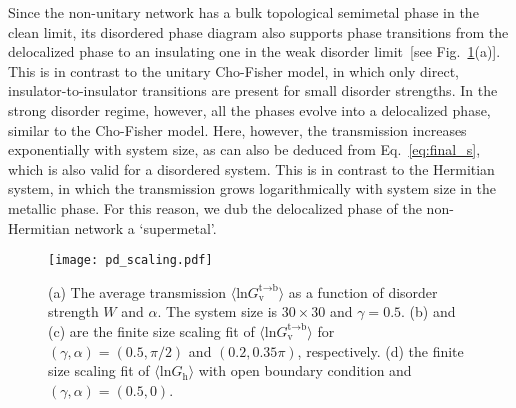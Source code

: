\documentclass[aps,pra,reprint,superscriptaddress,showkeys,amsmath,amssymb,longbibliography]{revtex4-1}
\begin{document}
Since the non-unitary network has a bulk topological semimetal phase in the clean limit, its disordered phase diagram also supports phase transitions from the delocalized phase to an insulating one in the weak disorder limit~[see Fig.\ \ref{fig: pd_disorder}(a)].
This is in contrast to the unitary Cho-Fisher model, in which only direct, insulator-to-insulator transitions are present for small disorder strengths.
In the strong disorder regime, however, all the phases evolve into a delocalized phase, similar to the Cho-Fisher model.
Here, however, the transmission increases exponentially with system size, as can also be deduced from Eq.~\eqref{eq:final_s}, which is also valid for a disordered system.
This is in contrast to the Hermitian system, in which the transmission grows logarithmically with system size in the metallic phase.
For this reason, we dub the delocalized phase of the non-Hermitian network a `supermetal'.

\begin{figure}
\centering
\texttt{[image: pd\_scaling.pdf]}
\caption{(a) The average transmission $\langle\text{ln} G_{\text{v}}^{\text{t}\rightarrow\text{b}}\rangle$ as a function of disorder strength $W$ and $\alpha$. 
The system size is $30\times 30$ and $\gamma=0.5$. (b) and (c) are the finite size scaling fit of $\langle \text{ln}G_{\text{v}}^{\text{t}\rightarrow\text{b}}\rangle$ for $(\gamma, \alpha)=(0.5,\pi/2)$ and $(0.2,0.35\pi)$, respectively. 
(d) the finite size scaling fit of $\langle\text{ln} G_{\text{h}}\rangle$ with open boundary condition and $(\gamma,\alpha)=(0.5,0)$. 
\label{fig: pd_disorder}}
\end{figure}
\end{document}
